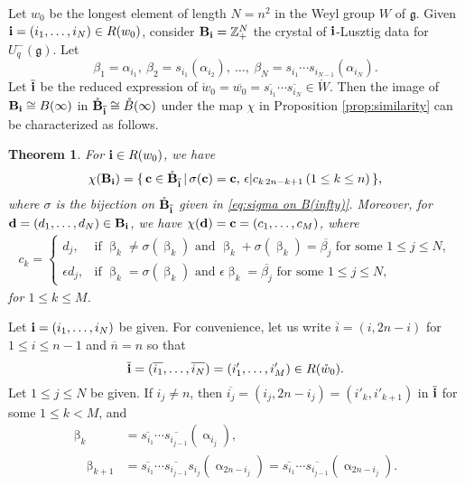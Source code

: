 \documentclass[leqno,11pt]{amsart}
\newtheorem{thm}{\bf Theorem}[section]
\numberwithin{equation}{section}
\newcommand{\bs}{\boldsymbol}
\newcommand{\B}{\mathbf{B}}
\newcommand{\pf}{\noindent{\bfseries Proof. }}
\newcommand{\ov}{\overline}
\newcommand{\bi}{\bs{\rm i}}
\newcommand{\Z}{\mathbb{Z}}
\newcommand{\g}{\mathfrak{g}}
\begin{document}
Let $w_0$ be the longest element of length $N=n^2$ in the Weyl group $W$ of $\g$.
Given ${\bi}=(i_1,\ldots,i_{{N}})\in R(w_0)$, consider $\B_{\bi}=\Z_+^N$ the crystal of $\bi$-Lusztig data for $U_q^-(\g)$.
Let 
\begin{equation*}
\beta_1=\alpha_{i_1},\  \beta_2=s_{i_1}(\alpha_{i_2}), \ \ldots ,\ \beta_N=s_{i_1}\cdots s_{i_{{N}-1}}(\alpha_{i_{{N}}}).
\end{equation*}
Let $\ov{\bi}$ be the reduced expression of 
$\mathring{w}_0=\ov{w_0}=\ov{s_{i_1}}\cdots \ov{s_{i_N}}\in \mathring{W}$.
Then the image of $\B_{\bi}\cong B(\infty)$ in $\mathring{\B}_{\ov{\bi}}\cong \mathring{B}(\infty)$ under the map $\chi$ in Proposition \ref{prop:similarity} can be characterized as follows.


\begin{thm}\label{thm:image of PBW under chi}
For $\bi\in R(w_0)$, we have
\begin{equation*}
\chi (\B_{\bi}) = \{\,{\bf c}\in \mathring{\B}_{\ov{\bi}}\,|\,\sigma({\bf c})={\bf c},\, \epsilon|c_{k\,2n-k+1}\,(1\leq k\leq n)\,\},
\end{equation*}
where $\sigma$ is the bijection on $\mathring{\B}_{\ov{\bi}}$ given in \eqref{eq:sigma on B(infty)}. 
Moreover, for ${\bf d}=(d_1,\ldots,d_N)\in \B_{\bi}$,
we have 
$\chi({\bf d})={\bf c}=(c_1,\ldots,c_M)$, where 
\begin{equation}\label{eq:image of d under xi}
\begin{split}
c_k=
\begin{cases}
d_j, & \text{if $\upbeta_k\neq \sigma(\upbeta_k)$ and $\upbeta_k+\sigma(\upbeta_k)=\ov{\beta_j}$ for some $1\leq j\leq N$},\\
\epsilon d_j, & \text{if $\upbeta_k = \sigma(\upbeta_k)$ and $\epsilon\upbeta_k=\ov{\beta_j}$ for some $1\leq j\leq N$},
\end{cases}
\end{split}
\end{equation} 
for $1\leq k\leq M$.
\end{thm}
\pf Let $\bi=(i_1,\ldots,i_N)$ be given. 
For convenience, let us write $\ov{i} = (i,2n-i)$ for $1\leq i\leq n-1$ and $\ov{n}=n$
so that 
\begin{equation*}
\ov{\bi}=(\ov{i_1},\ldots,\ov{i_N})=(i'_1,\ldots,i'_M)\in R(\mathring{w}_0).
\end{equation*}
Let $1\leq j\leq N$ be given. If $i_j\neq n$, then $\ov{i_j}=(i_j,2n-i_j)=(i'_k,i'_{k+1})$ in $\ov{\bi}$ for some $1\leq k<M$, and
\begin{equation*}
\begin{split}
\upbeta_{k}&=\ov{s_{i_1}}\cdots \ov{s_{i_{j-1}}}(\upalpha_{i_j}),\\ \quad
\upbeta_{{k+1}}&=\ov{s_{i_1}}\cdots \ov{s_{i_{j-1}}}s_{i_j}(\upalpha_{2n-i_j})
=\ov{s_{i_1}}\cdots \ov{s_{i_{j-1}}}(\upalpha_{2n-i_j}).
\end{split}
\end{equation*}
\end{document}
